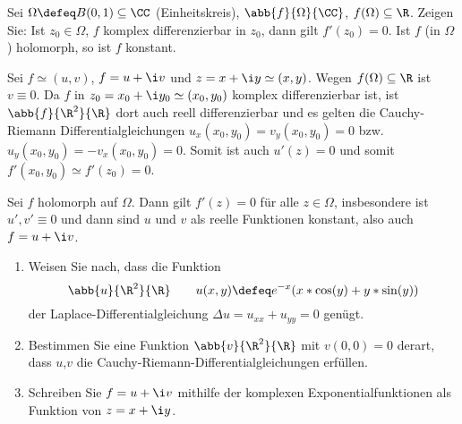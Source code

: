 \begin{exercisePage}
	
	\begin{task}
		Sei $\Omega \defeq B(0,1) \subseteq \CC$ (Einheitskreis), $\abb{f}{\Omega}{\CC}$, $f(\Omega) \subseteq \R$. Zeigen Sie: Ist $z_0 \in \Omega$, $f$ komplex differenzierbar in $z_0$, dann gilt $f'(z_0) = 0$. Ist $f$ (in $\Omega$) holomorph, so ist $f$ konstant.
	\end{task}
	
	Sei $f \simeq (u,v)$, $f = u + \i v$ und $z=x + \i y \simeq (x,y)$. Wegen $f(\Omega) \subseteq \R$ ist $v \equiv 0$. Da $f$ in $z_0 = x_0 + \i y_0 \simeq (x_0, y_0)$ komplex differenzierbar ist, ist $\abb{f}{\R^2}{\R}$ dort auch reell differenzierbar und es gelten die Cauchy-Riemann Differentialgleichungen $u_x(x_0,y_0) = v_y(x_0, y_0) = 0$ bzw. $u_y(x_0, y_0) = -v_x(x_0, y_0) = 0$. Somit ist auch $u'(z) = 0$ und somit $f'(x_0,y_0) \simeq f'(z_0) = 0$.
	
	Sei $f$ holomorph auf $\Omega$. Dann gilt $f'(z) = 0$ für alle $z \in \Omega$, insbesondere ist $u',v' \equiv 0$ und dann sind $u$ und $v$ als reelle Funktionen konstant, also auch $f  = u + \i  v$.
	
	
	\begin{task}
		\begin{enumerate}[label=(\alph*), nolistsep]
			\item Weisen Sie nach, dass die Funktion 
			\begin{equation*}
				\abb{u}{\R^2}{\R} \qquad u(x,y) \defeq e^{-x} (x * \cos(y) + y * \sin(y))
			\end{equation*}
			der Laplace-Differentialgleichung $\Delta u = u_{xx} + u_{yy}  = 0$ genügt.
			\item Bestimmen Sie eine Funktion $\abb{v}{\R^2}{\R}$ mit $v(0,0) = 0$ derart, dass $u$,$v$ die Cauchy-Riemann-Differentialgleichungen erfüllen.
			\item Schreiben Sie $f = u + \i v$ mithilfe der komplexen Exponentialfunktionen als Funktion von $z = x + \i y$.
		\end{enumerate}
	\end{task}


\end{exercisePage}
